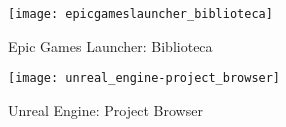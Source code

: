 
    \begin{figure}[h]
        \caption{Epic Games Launcher: Biblioteca}
        \centering
        \texttt{[image: epicgameslauncher\_biblioteca]}
        \label{fig:egl_biblioteca}
    \end{figure}

    \begin{figure}[h]
        \caption{Unreal Engine: Project Browser}
        \centering
        \texttt{[image: unreal\_engine-project\_browser]}
        \label{fig:ue_project_browser}
    \end{figure}
